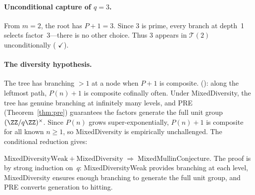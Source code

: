 \paragraph{Unconditional capture of $q = 3$.}
From $m = 2$, the root has $P{+}1 = 3$.  Since $3$ is prime, every
branch at depth~1 selects factor~$3$---there is no other choice.
Thus $3$ appears in $\mathcal{T}(2)$ unconditionally
(
{\color{leanink}$\checkmark$}).

\paragraph{The diversity hypothesis.}
The tree has branching $> 1$ at a node when $P{+}1$ is composite.
():
along the leftmost path, $P(n){+}1$ is composite cofinally often.
Under MixedDiversity, the tree has genuine branching at infinitely
many levels, and PRE (Theorem~\ref{thm:pre}) guarantees the factors
generate the full unit group $(\ZZ/q\ZZ)^\times$.
Since $P(n)$ grows super-exponentially, $P(n){+}1$ is composite for
all known $n \geq 1$, so MixedDiversity is empirically unchallenged.
The conditional reduction gives:

\begin{theorem}
\label{thm:diversity-mixed-mc}
$\mathrm{MixedDiversityWeak} + \mathrm{MixedDiversity}
\;\Longrightarrow\; \mathrm{MixedMullinConjecture}$.
The proof is by strong induction on~$q$: MixedDiversityWeak provides
branching at each level, MixedDiversity ensures enough branching
to generate the full unit group, and PRE converts generation to hitting.
\end{theorem}

